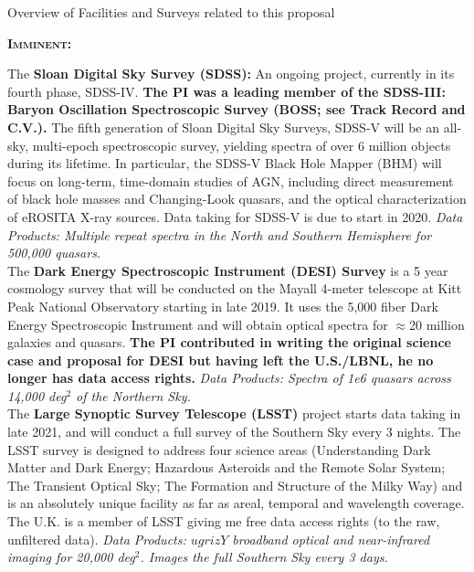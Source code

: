 
\begin{framed}
 \begin{tcolorbox}
   \begin{center} 
     Overview of Facilities and Surveys related to this proposal
   \end{center}
 \end{tcolorbox}
  
\noindent
\textbf{\textsc{Imminent:}}

The {\bf Sloan Digital Sky Survey (SDSS):} An ongoing project,
currently in its fourth phase, SDSS-IV.  {\bf The PI was a leading
member of the SDSS-III: Baryon Oscillation Spectroscopic Survey (BOSS;
see Track Record and C.V.).} The fifth generation of Sloan Digital Sky
Surveys, SDSS-V will be an all-sky, multi-epoch spectroscopic survey,
yielding spectra of over 6 million objects during its lifetime. In
particular, the SDSS-V Black Hole Mapper (BHM) will focus on
long-term, time-domain studies of AGN, including direct measurement of
black hole masses and Changing-Look quasars, and the optical
characterization of eROSITA X-ray sources. Data taking for SDSS-V is due to start
in 2020.  {\it Data Products: Multiple repeat spectra
in the North and Southern Hemisphere for 500,000 quasars.} \\

The {\bf Dark Energy Spectroscopic Instrument (DESI) Survey} is a 5
year cosmology survey that will be conducted on the Mayall 4-meter
telescope at Kitt Peak National Observatory starting in late 2019. It uses
the 5,000 fiber Dark Energy Spectroscopic Instrument and will obtain
optical spectra for $\approx$20 million galaxies and quasars.  {\bf
The PI contributed in writing the original science case and proposal
for DESI \citep{Schlegel2011} but having left the U.S./LBNL, he no
longer has data access rights.}  {\it Data Products: Spectra of 1e6
quasars across 14,000 deg$^{2}$ of the Northern Sky.} \\

The {\bf Large Synoptic Survey Telescope (LSST)} project starts data
taking in late 2021, and will conduct a full survey of the
Southern Sky every 3 nights. The LSST survey is designed to address
four science areas (Understanding Dark Matter and Dark
Energy; Hazardous Asteroids and the Remote Solar System; The Transient
Optical Sky; The Formation and Structure of the Milky Way) and is an
absolutely unique facility as far as areal, temporal and wavelength
coverage. The U.K.  is a member of LSST giving me free data access
rights (to the raw, unfiltered data).  {\it Data Products:
$ugrizY$ broadband optical and near-infrared imaging for 20,000
deg$^2$.  Images the full Southern Sky every 3 days.} \\



\end{framed}
